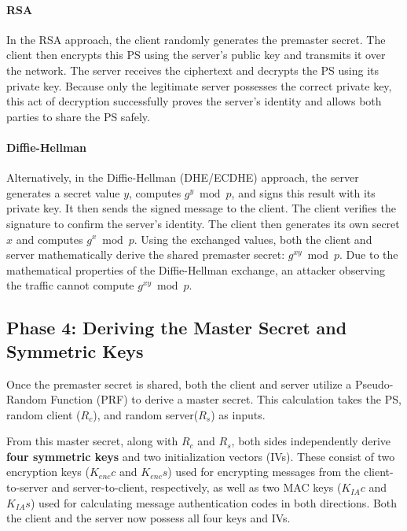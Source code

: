 \paragraph{RSA}
In the RSA approach, the client randomly generates the premaster secret. The client then encrypts this PS using the server's public key and transmits it over the network. The server receives the ciphertext and decrypts the PS using its private key. Because only the legitimate server possesses the correct private key, this act of decryption successfully proves the server's identity and allows both parties to share the PS safely.


\paragraph{Diffie-Hellman}
Alternatively, in the Diffie-Hellman (DHE/ECDHE) approach, the server generates a secret value $y$, computes $g^y \bmod p$, and signs this result with its private key. It then sends the signed message to the client. The client verifies the signature to confirm the server's identity. The client then generates its own secret $x$ and computes $g^x \bmod p$. Using the exchanged values, both the client and server mathematically derive the shared premaster secret: $g^{xy} \bmod p$. Due to the mathematical properties of the Diffie-Hellman exchange, an attacker observing the traffic cannot compute $g^{xy} \bmod p$.


\subsection{Phase 4: Deriving the Master Secret and Symmetric Keys}
Once the premaster secret is shared, both the client and server utilize a Pseudo-Random Function (PRF) to derive a master secret. This calculation takes the PS, random client ($R_c$), and random server($R_s$) as inputs.

From this master secret, along with $R_c$ and $R_s$, both sides independently derive \textbf{four symmetric keys} and two initialization vectors (IVs). These consist of two encryption keys ($K_{enc}c$ and $K_{enc}s$) used for encrypting messages from the client-to-server and server-to-client, respectively, as well as two MAC keys ($K_{IA}c$ and $K_{IA}s$) used for calculating message authentication codes in both directions. Both the client and the server now possess all four keys and IVs.

